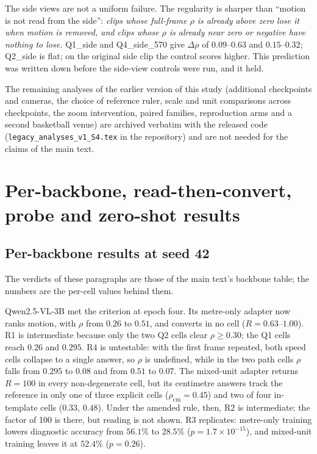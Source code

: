 \documentclass[11pt]{article}
\newcommand{\rhosp}{\ensuremath{\rho}}
\begin{document}
The side views are not a uniform failure. The regularity is sharper than
``motion is not read from the side'': \emph{clips whose full-frame \rhosp{} is
already above zero lose it when motion is removed, and clips whose \rhosp{} is
already near zero or negative have nothing to lose.} Q1\_side and
Q4\_side\_570 give $\Delta\rho$ of $0.09$--$0.63$ and $0.15$--$0.32$;
Q2\_side is flat; on the original side clip the control scores higher.
This prediction was written down before the side-view controls were run, and it
held.


\noindent The remaining analyses of the earlier version of this study (additional checkpoints and cameras, the choice of reference ruler, scale and unit comparisons across checkpoints, the zoom intervention, paired families, reproduction arms and a second basketball venue) are archived verbatim with the released code (\texttt{legacy\_analyses\_v1\_S4.tex} in the repository) and are not needed for the claims of the main text.

\section{Per-backbone, read-then-convert, probe and zero-shot results}
\label{supp:revision}

\subsection{Per-backbone results at seed 42}
\label{supp:backbones42}

The verdicts of these paragraphs are those of the main text's backbone table;
the numbers are the per-cell values behind them.

Qwen2.5-VL-3B met the criterion at epoch four. Its metre-only adapter now
ranks motion, with $\rho$ from $0.26$ to $0.51$, and converts in no cell
($R=0.63$--$1.00$). R1 is intermediate because only the two Q2 cells clear
$\rho\ge0.30$; the Q1 cells reach $0.26$ and $0.295$. R4 is untestable: with the
first frame repeated, both speed cells collapse to a single answer, so $\rho$
is undefined, while in the two path cells $\rho$ falls from $0.295$ to $0.08$ and
from $0.51$ to $0.07$. The mixed-unit adapter returns $R=100$ in every
non-degenerate cell, but its centimetre answers track the reference in only one
of three explicit cells ($\rho_{\mathrm{cm}}=0.45$) and two of four in-template
cells ($0.33$, $0.48$). Under the amended rule, then, R2 is intermediate: the
factor of 100 is there, but reading is not shown. R3 replicates: metre-only
training lowers diagnostic accuracy from $56.1\%$ to $28.5\%$
($p=1.7\times10^{-15}$), and mixed-unit training leaves it at $52.4\%$
($p=0.26$).
\end{document}
